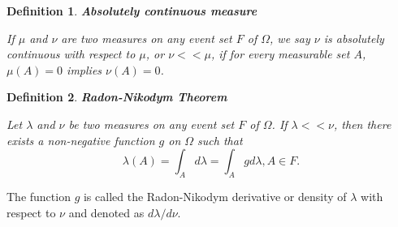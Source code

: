 \documentclass[12pt]{amsart}
\newtheorem{definition}{Definition}
\theoremstyle{plain}
\theoremstyle{definition}
\theoremstyle{remark}
\numberwithin{equation}{section}
\numberwithin{thm}{section}
\begin{document}
\begin{definition} 
\textbf{Absolutely continuous measure}

If $\mu$ and $\nu$ are two measures on any event set $F$ of $\Omega$, we say $\nu$ is absolutely continuous with respect to $\mu$, or $\nu << \mu$, if for every measurable set $A$, $\mu(A)=0$ implies $\nu(A)=0$.

\end{definition}


\begin{definition} 
\textbf{Radon-Nikodym Theorem}

Let $\lambda$ and $\nu$ be two measures on any event set $F$ of $\Omega$. If $\lambda << \nu$, then there exists a non-negative function $g$ on $\Omega$ such that 
\begin{equation}
    \lambda(A) = \int_{A}d\lambda = \int_{A}gd\lambda, A \in F.
\end{equation}
\end{definition}
The function $g$ is called the Radon-Nikodym derivative or density of $\lambda$ with respect to $\nu$ and denoted as $d\lambda/d\nu$.
\end{document}
